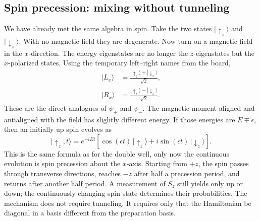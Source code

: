 \begin{classroomqa}
\end{classroomqa}

\begin{classroomqa}
\end{classroomqa}

\subsection{Spin precession: mixing without tunneling}

We have already met the same algebra in spin. Take the two states \(|\uparrow_z\rangle\) and \(|\downarrow_z\rangle\). With no magnetic field they are degenerate. Now turn on a magnetic field in the \(x\)-direction. The energy eigenstates are no longer the \(z\)-eigenstates but the \(x\)-polarized states. Using the temporary left--right names from the board,
\begin{align}
|L_x\rangle &= \frac{|\uparrow_z\rangle+|\downarrow_z\rangle}{\sqrt{2}},\\
|R_x\rangle &= \frac{|\uparrow_z\rangle-|\downarrow_z\rangle}{\sqrt{2}}.
\end{align}
These are the direct analogues of \(\psi_+\) and \(\psi_-\). The magnetic moment aligned and antialigned with the field has slightly different energy. If those energies are \(E\mp\epsilon\), then an initially up spin evolves as
\begin{equation}
|\uparrow_z,t\rangle
= e^{-iEt}\left[\cos(\epsilon t)\,|\uparrow_z\rangle
+ i\sin(\epsilon t)\,|\downarrow_z\rangle\right].
\end{equation}
This is the same formula as for the double well, only now the continuous evolution is spin precession about the \(x\)-axis. Starting from \(+z\), the spin passes through transverse directions, reaches \(-z\) after half a precession period, and returns after another half period. A measurement of \(S_z\) still yields only up or down; the continuously changing spin state determines their probabilities. The mechanism does not require tunneling. It requires only that the Hamiltonian be diagonal in a basis different from the preparation basis.

